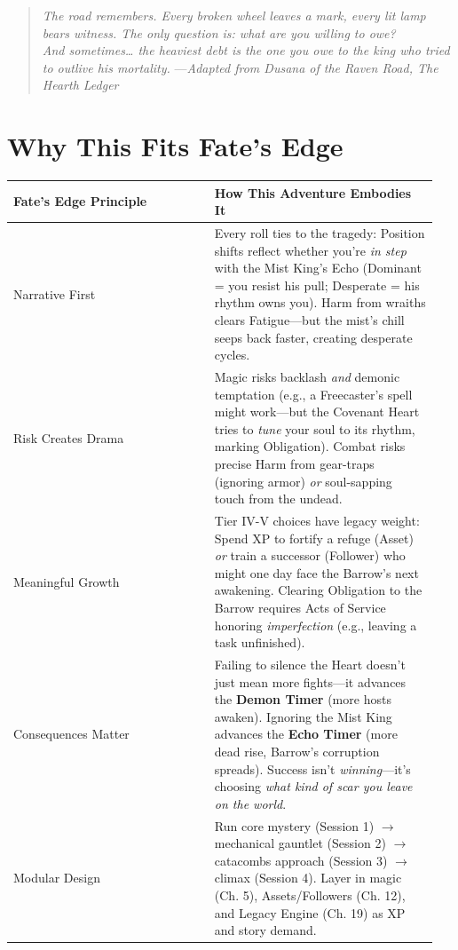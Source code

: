 \documentclass[12pt]{article}
\begin{document}
\begin{quote}
\textit{The road remembers. Every broken wheel leaves a mark, every lit lamp bears witness. The only question is: what are you willing to owe? \\ 
And sometimes\ldots{} the heaviest debt is the one you owe to the king who tried to outlive his mortality.}
\hfill ---\textit{Adapted from Dusana of the Raven Road, The Hearth Ledger}
\end{quote}

\section{Why This Fits Fate's Edge}
\begin{tabular}{|p{0.45\linewidth}|p{0.5\linewidth}|}
\hline
\textbf{Fate's Edge Principle} & \textbf{How This Adventure Embodies It} \\
\hline
Narrative First & Every roll ties to the tragedy: Position shifts reflect whether you're \textit{in step} with the Mist King's Echo (Dominant = you resist his pull; Desperate = his rhythm owns you). Harm from wraiths clears Fatigue---but the mist's chill seeps back faster, creating desperate cycles. \\
\hline
Risk Creates Drama & Magic risks backlash \textit{and} demonic temptation (e.g., a Freecaster's spell might work---but the Covenant Heart tries to \textit{tune} your soul to its rhythm, marking Obligation). Combat risks precise Harm from gear-traps (ignoring armor) \textit{or} soul-sapping touch from the undead. \\
\hline
Meaningful Growth & Tier IV-V choices have legacy weight: Spend XP to fortify a refuge (Asset) \textit{or} train a successor (Follower) who might one day face the Barrow's next awakening. Clearing Obligation to the Barrow requires Acts of Service honoring \textit{imperfection} (e.g., leaving a task unfinished). \\
\hline
Consequences Matter & Failing to silence the Heart doesn't just mean more fights---it advances the \textbf{Demon Timer } (more hosts awaken). Ignoring the Mist King advances the \textbf{Echo Timer } (more dead rise, Barrow's corruption spreads). Success isn't \textit{winning}---it's choosing \textit{what kind of scar you leave on the world}. \\
\hline
Modular Design & Run core mystery (Session 1) $\rightarrow$ mechanical gauntlet (Session 2) $\rightarrow$ catacombs approach (Session 3) $\rightarrow$ climax (Session 4). Layer in magic (Ch. 5), Assets/Followers (Ch. 12), and Legacy Engine (Ch. 19) as XP and story demand. \\
\hline
\end{tabular}
\end{document}
